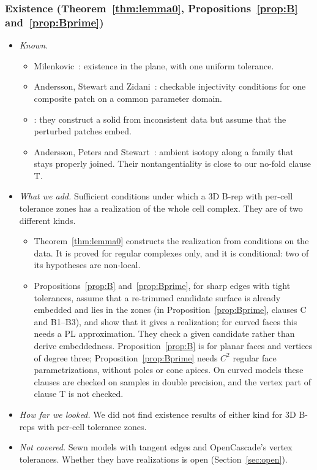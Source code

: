 \subsubsection*{Existence (Theorem~\ref{thm:lemma0}, Propositions~\ref{prop:B} and~\ref{prop:Bprime})}
\begin{itemize}
\item \emph{Known.}
  \begin{itemize}
  \item Milenkovic~\cite{Milenkovic88}: existence in the plane, with one uniform tolerance.
  \item Andersson, Stewart and Zidani~\cite{ASZ06}: checkable injectivity conditions for one composite patch on a common
  parameter domain.
  \item \cite{ASZ07,SZ08}: they construct a solid from inconsistent data but assume that the perturbed patches embed.
  \item Andersson, Peters and Stewart~\cite[Thm.~1]{APS00}: ambient isotopy along a family that stays properly joined.
  Their nontangentiality is close to our no-fold clause T.
  \end{itemize}
\item \emph{What we add.} Sufficient conditions under which a 3D B-rep with per-cell tolerance zones has a realization
of the whole cell complex. They are of two different kinds.
  \begin{itemize}
  \item Theorem~\ref{thm:lemma0} constructs the realization from conditions on the data. It is proved for regular
  complexes only, and it is conditional: two of its hypotheses are non-local.
  \item Propositions~\ref{prop:B} and~\ref{prop:Bprime}, for sharp edges with tight tolerances, assume that a
  re-trimmed candidate surface is already embedded and lies in the zones (in Proposition~\ref{prop:Bprime}, clauses C
  and B1--B3), and show that it gives a realization; for curved faces this needs a PL approximation. They check a given
  candidate rather than derive embeddedness. Proposition~\ref{prop:B} is for planar faces and vertices of degree three;
  Proposition~\ref{prop:Bprime} needs $C^2$ regular face parametrizations, without poles or cone apices. On curved models these clauses are
  checked on samples in double precision, and the vertex part of clause T is not checked.
  \end{itemize}
\item \emph{How far we looked.} We did not find existence results of either kind for 3D B-reps with per-cell
tolerance zones.
\item \emph{Not covered.} Sewn models with tangent edges and OpenCascade's vertex tolerances. Whether they have
realizations is open (Section~\ref{sec:open}).
\end{itemize}

